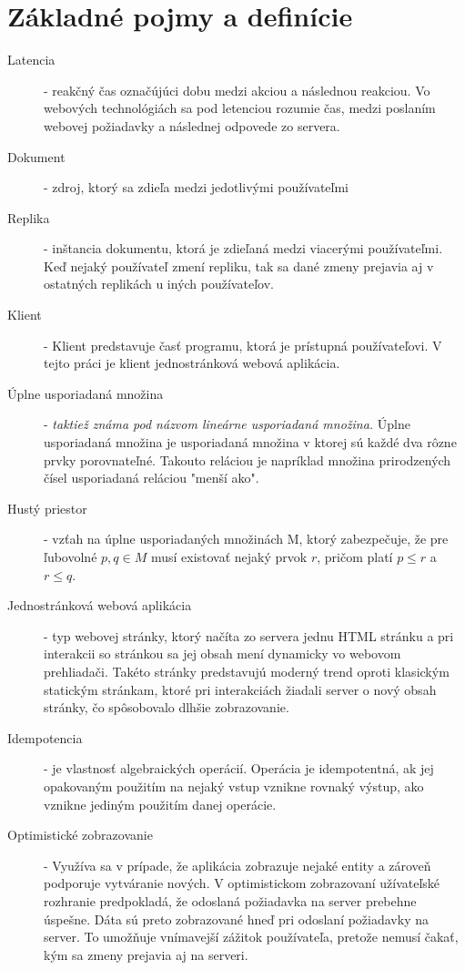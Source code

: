 \chapter{Základné pojmy a definície}

\label{kap:zakladne} %

\begin{description}
\item [Latencia] - reakčný čas označújúci dobu medzi akciou a následnou reakciou. Vo webových 
technológiách sa pod letenciou rozumie čas, medzi poslaním webovej požiadavky a následnej
odpovede zo servera.
\item [Dokument] - zdroj, ktorý sa zdieľa medzi jedotlivými používateľmi
\item [Replika] - inštancia dokumentu, ktorá je zdieľaná medzi viacerými používateľmi. Keď nejaký
používateľ zmení repliku, tak sa dané zmeny prejavia aj v ostatných replikách u iných
používateľov.
\item [Klient] - Klient predstavuje časť programu, ktorá je prístupná používateľovi. V tejto práci
je klient jednostránková webová aplikácia.
\item [Úplne usporiadaná množina] - \textit{taktiež známa pod názvom lineárne usporiadaná množina.} 
Úplne usporiadaná množina je usporiadaná množina v ktorej sú každé dva rôzne prvky porovnateľné. 
Takouto reláciou je napríklad množina prirodzených čísel usporiadaná reláciou "menší ako".
\item [Hustý priestor] - vzťah na úplne usporiadaných množinách M, ktorý zabezpečuje, že pre 
ľubovolné $p, q \in M$ musí existovať nejaký prvok $r$, pričom platí $p \leq r$ a 
$r \leq q$.
\item [Jednostránková webová aplikácia] - typ webovej stránky, ktorý načíta zo servera jednu HTML
stránku a pri interakcii so stránkou sa jej obsah mení dynamicky vo webovom prehliadači. Takéto
stránky predstavujú moderný trend oproti klasickým statickým stránkam, ktoré pri interakciách
žiadali server o nový obsah stránky, čo spôsobovalo dlhšie zobrazovanie.
\item [Idempotencia] - je vlastnosť algebraických operácií. Operácia je idempotentná, ak jej
opakovaným použitím na nejaký vstup vznikne rovnaký výstup, ako vznikne jediným použitím danej
operácie.
\item [Optimistické zobrazovanie] - Využíva sa v prípade, že aplikácia zobrazuje nejaké entity a
zároveň podporuje vytváranie nových. V optimistickom zobrazovaní užívateľské rozhranie predpokladá,
že odoslaná požiadavka na server prebehne úspešne. Dáta sú preto zobrazované hneď pri odoslaní
požiadavky na server. To umožňuje vnímavejší zážitok používateľa, pretože nemusí čakať, kým sa
zmeny prejavia aj na serveri.
\end{description}
